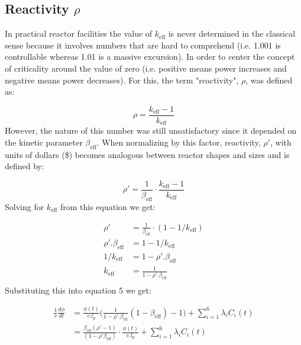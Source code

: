 \documentclass[11pt,letterpaper,titlepage]{article}
\begin{document}
\subsection{Reactivity $\rho$}
In practical reactor facilities the value of $k_{\mathrm{eff}}$ is never determined in the classical sense because it involves numbers that are hard to comprehend (i.e. 1.001 is controllable whereas 1.01 is a massive excursion). In order to center the concept of criticality around the value of zero (i.e. positive means power increases and negative means power decreases). For this, the term "reactivity", $\rho$, was defined as:

$$
\rho=\frac{k_{\mathrm{eff}}-1}{k_{\mathrm{eff}}}
$$
\noindent
However, the nature of this number was still unsatisfactory since it depended on the kinetic parameter $\beta_{\mathrm{eff}}$. When normalizing by this factor, reactivity, $\rho'$, with units of dollars (\$) becomes analogous between reactor shapes and sizes and is defined by:

\begin{equation}
\rho'=\frac{1}{\beta_{\mathrm{eff}}}\cdot \frac{k_{\mathrm{eff}}-1}{k_{\mathrm{eff}}}
\end{equation}
\noindent
Solving for $k_{\mathrm{eff}}$ from this equation we get:

\begin{equation*}
\begin{aligned}
\rho' &=\frac{1}{\beta_{\mathrm{eff}}}\cdot (1-1/k_{\mathrm{eff}}) \\
\rho'.\beta_{\mathrm{eff}} &=1-1/k_{\mathrm{eff}} \\
1/k_{\mathrm{eff}}  &=1-\rho'.\beta_{\mathrm{eff}} \\
k_{\mathrm{eff}}  &=\frac{1}{1-\rho'.\beta_{\mathrm{eff}}} \\
\end{aligned}
\end{equation*}
\noindent
Substituting this into equation 5 we get:

\begin{equation*}
\begin{aligned}
\frac{1}{v}\frac{d\phi}{dt}&=\frac{\phi(t)}{v.l_p}\biggr(\frac{1}{1-\rho'.\beta_{\mathrm{eff}}}(1-\beta_{\mathrm{eff}})-1\biggr) + \sum_{i=1}^6 \lambda_i C_i (t) \\
&= \frac{\beta_{\mathrm{eff}}(\rho'-1)}{(1-\rho'\beta_{\mathrm{eff}})}\cdot \frac{\phi(t)}{v.l_p}  + \sum_{i=1}^6 \lambda_i C_i (t) \\
\end{aligned}
\end{equation*}
\end{document}
